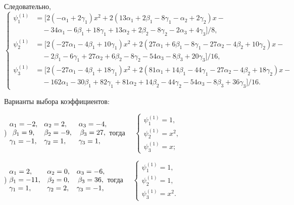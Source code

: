 \documentclass[11pt]{article}
\begin{document}
{Следовательно,
\[
\left\{
\begin{aligned}
\psi_1^{(1)} &= \big[2(- \alpha_1 + 2\gamma_1)x^2 + 2(13\alpha_1 + 2\beta_1 -8\gamma_1 - \alpha_2 + 2\gamma_2)x - \\
&\quad -34\alpha_1 - 6\beta_1 + 18\gamma_1 + 13\alpha_2 + 2\beta_2 - 8\gamma_2 - 2\alpha_3 + 4\gamma_3\big]/8, \\
\psi_2^{(1)} &= \big[2( - 27\alpha_1 - 4\beta_1 + 10\gamma_1)x^2 + 2(27\alpha_1 + 6\beta_1 - 8\gamma_1 - 27\alpha_2 - 4\beta_2 + 10\gamma_2)x - \\
&\quad - 2\beta_1 - 6\gamma_1 + 27\alpha_2 + 6\beta_2 - 8\gamma_2 - 54\alpha_3 - 8\beta_3 + 20\gamma_3\big]/16, \\
\psi_3^{(1)} &= \big[2( - 27\alpha_1 - 4\beta_1 + 18\gamma_1)x^2 + 2(81\alpha_1 + 14\beta_1 - 44\gamma_1 -27\alpha_2 - 4\beta_2 + 18\gamma_2)x - \\
&\quad -162\alpha_1 - 30\beta_1 + 82\gamma_1 + 81\alpha_2 + 14\beta_2 - 44\gamma_2 -54\alpha_3 - 8\beta_3 + 36\gamma_3\big]/16.
\end{aligned}
\right.
\]

Варианты выбора коэффициентов:

) $\begin{matrix} \alpha_1 = -2,\hfill\\ \beta_1 = 9,\\ \gamma_1 = -1,\hfill \end{matrix}$ \
$\begin{matrix} \alpha_2 = 2,\hfill\\ \beta_2 = -9,\\ \gamma_2 = 1,\hfill \end{matrix}$ \
$\begin{matrix} \alpha_3 = -4,\hfill\\ \beta_3 = 27,\\ \gamma_3 = 1,\hfill \end{matrix}$
тогда \ \ $\begin{cases} 
\psi_1^{(1)} = 1, \\
\psi_2^{(1)} = x^2, \\
\psi_3^{(1)} = x;
\end{cases}$

) $\begin{matrix} \alpha_1 = 2,\hfill\\ \beta_1 = -11,\\ \gamma_1 = 1,\hfill \end{matrix}$ \
$\begin{matrix} \alpha_2 = 0,\hfill\\ \beta_2 = 0,\\ \gamma_2 = 2,\hfill \end{matrix}$ \
$\begin{matrix} \alpha_3 = -6,\hfill\\ \beta_3 = 36,\\ \gamma_3 = -1,\hfill \end{matrix}$
тогда \ \ $\begin{cases} 
\psi_1^{(1)} = 1, \\
\psi_2^{(1)} = 1, \\
\psi_3^{(1)} = x^2.
\end{cases}$

}
\end{document}
